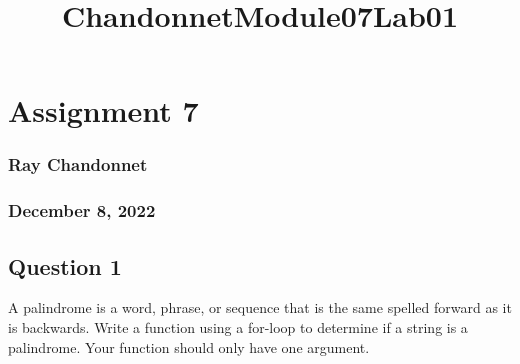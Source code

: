 \documentclass[11pt]{article}
\title{ChandonnetModule07Lab01}
\begin{document}
    
    \maketitle
    
    

    
    \hypertarget{assignment-7}{%
\section{Assignment 7}\label{assignment-7}}

\hypertarget{ray-chandonnet}{%
\subsubsection{Ray Chandonnet}\label{ray-chandonnet}}

\hypertarget{december-8-2022}{%
\subsubsection{December 8, 2022}\label{december-8-2022}}

    \hypertarget{question-1}{%
\subsection{Question 1}\label{question-1}}

A palindrome is a word, phrase, or sequence that is the same spelled
forward as it is backwards. Write a function using a for-loop to
determine if a string is a palindrome. Your function should only have
one argument.
\end{document}

